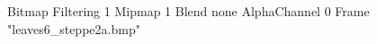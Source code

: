 {Bitmap
	{Filtering 1}
	{Mipmap 1}
	{Blend none}
	{AlphaChannel 0}
	{Frame "leaves6_steppe2a.bmp"}
}

